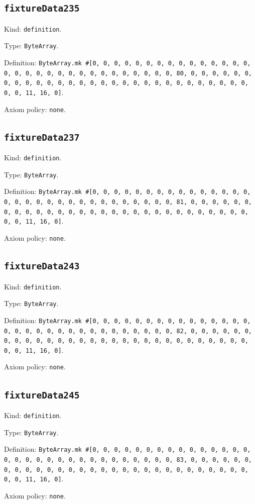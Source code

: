 \documentclass[11pt]{article}
\begin{document}
\subsection*{\texttt{fixtureData235}}
\noindent Kind: \texttt{definition}.\par
\noindent Type: \texttt{ByteArray}.\par
\noindent Definition: \texttt{ByteArray.mk \#[0, 0, 0, 0, 0, 0, 0, 0, 0, 0, 0, 0, 0, 0, 0, 0, 0, 0, 0, 0, 0, 0, 0, 0, 0, 0, 0, 0, 0, 0, 0, 80, 0, 0, 0, 0, 0, 0, 0, 0, 0, 0, 0, 0, 0, 0, 0, 0, 0, 0, 0, 0, 0, 0, 0, 0, 0, 0, 0, 0, 0, 0, 0, 11, 16, 0]}.\par
\noindent Axiom policy: \texttt{none}.\par
\subsection*{\texttt{fixtureData237}}
\noindent Kind: \texttt{definition}.\par
\noindent Type: \texttt{ByteArray}.\par
\noindent Definition: \texttt{ByteArray.mk \#[0, 0, 0, 0, 0, 0, 0, 0, 0, 0, 0, 0, 0, 0, 0, 0, 0, 0, 0, 0, 0, 0, 0, 0, 0, 0, 0, 0, 0, 0, 0, 81, 0, 0, 0, 0, 0, 0, 0, 0, 0, 0, 0, 0, 0, 0, 0, 0, 0, 0, 0, 0, 0, 0, 0, 0, 0, 0, 0, 0, 0, 0, 0, 11, 16, 0]}.\par
\noindent Axiom policy: \texttt{none}.\par
\subsection*{\texttt{fixtureData243}}
\noindent Kind: \texttt{definition}.\par
\noindent Type: \texttt{ByteArray}.\par
\noindent Definition: \texttt{ByteArray.mk \#[0, 0, 0, 0, 0, 0, 0, 0, 0, 0, 0, 0, 0, 0, 0, 0, 0, 0, 0, 0, 0, 0, 0, 0, 0, 0, 0, 0, 0, 0, 0, 82, 0, 0, 0, 0, 0, 0, 0, 0, 0, 0, 0, 0, 0, 0, 0, 0, 0, 0, 0, 0, 0, 0, 0, 0, 0, 0, 0, 0, 0, 0, 0, 11, 16, 0]}.\par
\noindent Axiom policy: \texttt{none}.\par
\subsection*{\texttt{fixtureData245}}
\noindent Kind: \texttt{definition}.\par
\noindent Type: \texttt{ByteArray}.\par
\noindent Definition: \texttt{ByteArray.mk \#[0, 0, 0, 0, 0, 0, 0, 0, 0, 0, 0, 0, 0, 0, 0, 0, 0, 0, 0, 0, 0, 0, 0, 0, 0, 0, 0, 0, 0, 0, 0, 83, 0, 0, 0, 0, 0, 0, 0, 0, 0, 0, 0, 0, 0, 0, 0, 0, 0, 0, 0, 0, 0, 0, 0, 0, 0, 0, 0, 0, 0, 0, 0, 11, 16, 0]}.\par
\noindent Axiom policy: \texttt{none}.\par
\end{document}
